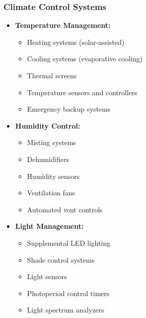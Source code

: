 \subsubsection{Climate Control Systems}
\begin{itemize}
    \item \textbf{Temperature Management:}
    \begin{itemize}
        \item Heating systems (solar-assisted)
        \item Cooling systems (evaporative cooling)
        \item Thermal screens
        \item Temperature sensors and controllers
        \item Emergency backup systems
    \end{itemize}
    
    \item \textbf{Humidity Control:}
    \begin{itemize}
        \item Misting systems
        \item Dehumidifiers
        \item Humidity sensors
        \item Ventilation fans
        \item Automated vent controls
    \end{itemize}
    
    \item \textbf{Light Management:}
    \begin{itemize}
        \item Supplemental LED lighting
        \item Shade control systems
        \item Light sensors
        \item Photoperiod control timers
        \item Light spectrum analyzers
    \end{itemize}
\end{itemize}

